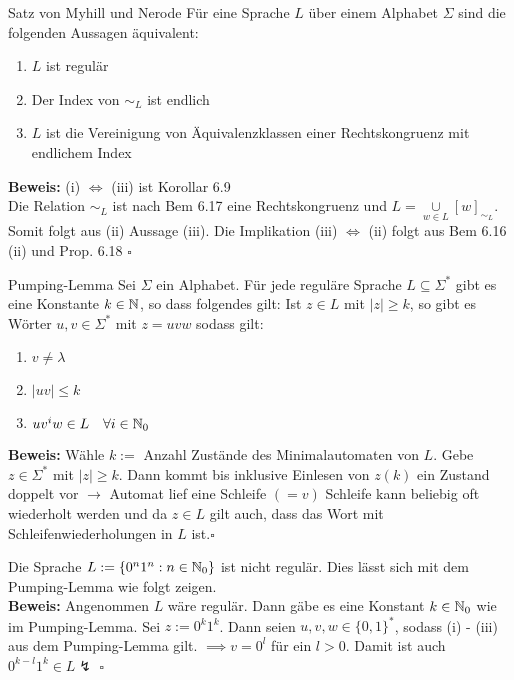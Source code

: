 \begin{satz}{Satz von Myhill und Nerode}
	Für eine Sprache $L$ über einem Alphabet $\Sigma$ sind die folgenden Aussagen äquivalent:
	\begin{enumerate}[label=(\roman*)]
		\item $L$ ist regulär
		\item Der Index von $\sim_L$ ist endlich
		\item $L$ ist die Vereinigung von Äquivalenzklassen einer Rechtskongruenz mit endlichem Index
	\end{enumerate}
	
	\textbf{Beweis:} (i) $\iff$ (iii) ist Korollar 6.9\\
	Die Relation $\sim_L$ ist nach Bem 6.17 eine Rechtskongruenz und $L = \underset{w \in L}{\cup}[w]_{\sim_L}$. Somit folgt aus (ii) Aussage (iii). Die Implikation (iii) $\iff$ (ii) folgt aus Bem 6.16 (ii) und Prop. 6.18 \hspace*{\fill}$\square$
\end{satz}

\begin{satz}{Pumping-Lemma}
	Sei $\Sigma$ ein Alphabet. Für jede reguläre Sprache $L \subseteq \Sigma^*$ gibt es eine Konstante $k \in \mathbb{N}$, so dass folgendes gilt: Ist $z \in L$ mit $|z| \geq k$, so gibt es Wörter $u, v \in \Sigma^*$ mit $z = uvw$ sodass gilt:
	\begin{enumerate}
		\item $v \neq \lambda$
		\item $|uv| \leq k$
		\item $u v^i w \in L \quad \forall i \in \mathbb{N}_0$
	\end{enumerate}
	
	\textbf{Beweis:} Wähle $k := $ Anzahl Zustände des Minimalautomaten von $L$. Gebe $z \in \Sigma^*$ mit $|z| \geq k$. Dann kommt bis inklusive Einlesen von $z(k)$ ein Zustand doppelt vor $\to$ Automat lief eine Schleife $(=v)$ Schleife kann beliebig oft wiederholt werden und da $z \in L$ gilt auch, dass das Wort mit Schleifenwiederholungen in $L$ ist.\hspace*{\fill}$\square$
\end{satz}

\begin{exam}
	Die Sprache $L := \{0^n 1^n : n \in \mathbb{N}_0\}$ ist nicht regulär. Dies lässt sich mit dem Pumping-Lemma wie folgt zeigen.\\
	
	\textbf{Beweis:} Angenommen $L$ wäre regulär. Dann gäbe es eine Konstant $k \in \mathbb{N}_0$ wie im Pumping-Lemma. Sei $z := 0^k 1^k$. Dann seien $u, v, w \in \{0, 1\}^*$, sodass (i) - (iii) aus dem Pumping-Lemma gilt. $\implies v = 0^l$ für ein $l > 0$. Damit ist auch $0^{k-l} 1^k \in L \lightning$ \hspace*{\fill}$\square$
\end{exam}

